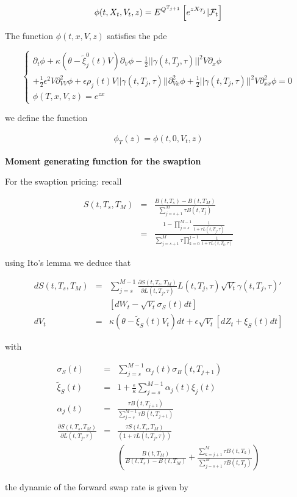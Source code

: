 \documentclass[10pt,a4paper,english,landscape]{slides}
\newcommand{\ban}{\begin{eqnarray*}}
\newcommand{\ean}{\end{eqnarray*}}
\newcommand{\ba}{\begin{eqnarray}}
\newcommand{\ea}{\end{eqnarray}}
\begin{document}
\ban
\phi(t,X_t,V_t,z)=E^{Q^{T_{j+1}}}\left[ e^{zX_{T_j}}|{\cal F}_t \right]
\ean

The function $\phi(t,x,V,z)$ satisfies the pde

\[
\left\lbrace 
\begin{array}{l}
\partial_t\phi+\kappa(\theta - \tilde \xi_j^0(t)V)\partial_V\phi -\frac{1}{2}||\gamma(t,T_j,\tau)||^2V\partial_x\phi \\
+\frac{1}{2}\epsilon^2V\partial^2_{VV}\phi+\epsilon\rho_j(t)V||\gamma(t,T_j,\tau)||\partial^2_{Vx}\phi+\frac{1}{2}||\gamma(t,T_j,\tau)||^2V\partial^2_{xx}\phi=0\\
\phi(T,x,V,z)=e^{zx}
\end{array}
\right.
\]



we define the function 

\ba
\phi_T(z)=\phi(t,0,V_t,z) \label{fi0}
\ea


{\bf Moment generating function for the swaption}

For the swaption pricing: recall 

\ban
S(t,T_s,T_M)&=&\frac{B(t,T_s)-B(t,T_M)}{\sum_{j=s+1}^{M}\tau B(t,T_j)}\\
&=&\frac{1 - \prod_{j=s}^{M-1}\frac{1}{1+\tau L(t,T_j,\tau)} }{\sum_{j=s+1}^{M}\tau \prod_{k=0}^{j-1}\frac{1}{1+\tau L(t,T_k,\tau)}}
\ean

using Ito's lemma we deduce that 

\ban
dS(t,T_s,T_M)&=&\sum_{j=s}^{M-1}\frac{\partial S(t,T_s,T_M) }{\partial L(t,T_j,\tau)}L(t,T_j,\tau)\sqrt{V_t}\gamma(t,T_j,\tau)'\\
& &[dW_t-\sqrt{V_t}\sigma_S(t)dt]\\
dV_t&=&\kappa(\theta - \tilde \xi_S(t)V_t)dt+\epsilon \sqrt{V_t}[dZ_t+\xi_S(t)dt]
\ean

with

\ban
\sigma_S(t)&=&\sum_{j=s}^{M-1}\alpha_j(t)\sigma_B(t,T_{j+1})\\
\tilde \xi_S(t)&=&1+\frac{\epsilon}{\kappa}\sum_{j=s}^{M-1}\alpha_j(t)\xi_j(t)\\
\alpha_j(t)&=&\frac{\tau B(t,T_{j+1})}{ \sum_{j=s}^{M-1} \tau B(t,T_{j+1})}\\
\frac{\partial S(t,T_s,T_M) }{\partial L(t,T_j,\tau)}&=&\frac{\tau S(t,T_s,T_M)}{(1+\tau L(t,T_j,\tau))}\\
&&\left( \frac{B(t,T_M)}{B(t,T_s)-B(t,T_M)}+\frac{\sum_{k=j+1}^M \tau B(t,T_k)}{\sum_{j=s+1}^{M}\tau B(t,T_j)}  \right)
\ean

the dynamic of the forward swap rate is given by
\end{document}
